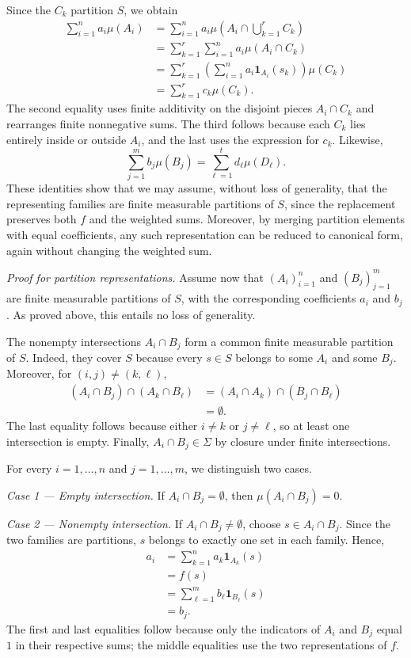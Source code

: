 \documentclass[10pt,a4paper]{article}
\begin{document}
Since the $C_k$ partition $S$, we obtain
\[
\begin{aligned}
\sum_{i=1}^{n}a_i\mu(A_i)
&=\sum_{i=1}^{n}a_i\mu\left(A_i\cap\bigcup_{k=1}^{r}C_k\right)\\
&=\sum_{k=1}^{r}\sum_{i=1}^{n}a_i\mu(A_i\cap C_k)\\
&=\sum_{k=1}^{r}\left(\sum_{i=1}^{n}a_i\mathbf1_{A_i}(s_k)\right)\mu(C_k)\\
&=\sum_{k=1}^{r}c_k\mu(C_k).
\end{aligned}
\]
The second equality uses finite additivity on the disjoint pieces $A_i\cap C_k$ and rearranges finite nonnegative sums. The third follows because each $C_k$ lies entirely inside or outside $A_i$, and the last uses the expression for $c_k$. Likewise,
\[
\sum_{j=1}^{m}b_j\mu(B_j)=\sum_{\ell=1}^{t}d_\ell\mu(D_\ell).
\]
These identities show that we may assume, without loss of generality, that the representing families are finite measurable partitions of $S$, since the replacement preserves both $f$ and the weighted sums. Moreover, by merging partition elements with equal coefficients, any such representation can be reduced to canonical form, again without changing the weighted sum.

\medskip
\textit{Proof for partition representations.}
Assume now that $(A_i)_{i=1}^{n}$ and $(B_j)_{j=1}^{m}$ are finite measurable partitions of $S$, with the corresponding coefficients $a_i$ and $b_j$. As proved above, this entails no loss of generality.

The nonempty intersections $A_i\cap B_j$ form a common finite measurable partition of $S$. Indeed, they cover $S$ because every $s\in S$ belongs to some $A_i$ and some $B_j$. Moreover, for $(i,j)\neq(k,\ell)$,
\[
\begin{aligned}
(A_i\cap B_j)\cap(A_k\cap B_\ell)
&=(A_i\cap A_k)\cap(B_j\cap B_\ell)\\
&=\emptyset.
\end{aligned}
\]
The last equality follows because either $i\neq k$ or $j\neq\ell$, so at least one intersection is empty. Finally, $A_i\cap B_j\in\Sigma$ by closure under finite intersections.

For every $i=1,\ldots,n$ and $j=1,\ldots,m$, we distinguish two cases.

\textit{Case 1 --- Empty intersection.} If $A_i\cap B_j=\emptyset$, then
$\mu(A_i\cap B_j)=0$.

\textit{Case 2 --- Nonempty intersection.} If $A_i\cap B_j\neq\emptyset$,
choose $s\in A_i\cap B_j$. Since the two families are partitions, $s$
belongs to exactly one set in each family. Hence,
\[
\begin{aligned}
a_i
&=\sum_{k=1}^{n}a_k\mathbf1_{A_k}(s)\\
&=f(s)\\
&=\sum_{\ell=1}^{m}b_\ell\mathbf1_{B_\ell}(s)\\
&=b_j.
\end{aligned}
\]
The first and last equalities follow because only the indicators of $A_i$
and $B_j$ equal $1$ in their respective sums; the middle equalities use the
two representations of $f$.
\end{document}
